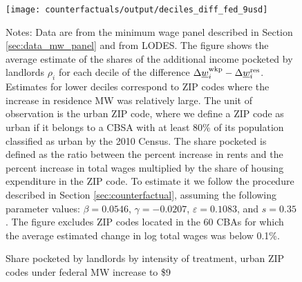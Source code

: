 \begin{figure}[h!]
    \centering
    \caption{Share pocketed by landlords by intensity of treatment, 
             urban ZIP codes under federal MW increase to \$9}
    \label{fig:rho_by_decile_MW_gap}

	\texttt{[image: counterfactuals/output/deciles\_diff\_fed\_9usd]}

    \begin{minipage}{.95\textwidth} \footnotesize
        \vspace{3mm}
        Notes:
        Data are from the minimum wage panel described in 
        Section \ref{sec:data_mw_panel} and from LODES.
        The figure shows the average estimate of the shares of the additional 
        income pocketed by landlords $\rho_i$ for each decile of the 
        difference $\Delta \underline{w}_i^{\text{wkp}} - \Delta \underline{w}_i^{\text{res}}$.
        Estimates for lower deciles correspond to ZIP codes where the increase 
        in residence MW was relatively large.
        The unit of observation is the urban ZIP code, where we define a ZIP code 
        as urban if it belongs to a CBSA with at least 80\% of its population 
        classified as urban by the 2010 Census.
        The share pocketed is defined as the ratio between the percent increase 
        in rents and the percent increase in total wages multiplied by the share 
        of housing expenditure in the ZIP code.
        To estimate it we follow the procedure described in Section 
        \ref{sec:counterfactual}, assuming the following parameter values: 
        $\beta = 0.0546$, $\gamma = -0.0207$, $\varepsilon = 0.1083$, and 
        $s = 0.35$.
        The figure excludes ZIP codes located in the 60 CBAs for which the average
        estimated change in log total wages was below 0.1\%.
    \end{minipage}
\end{figure}

